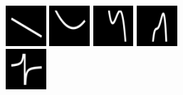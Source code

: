 \documentclass{article}
\begin{document}

\begin{figure}\vspace{-0.5cm} \newcommand{\functionSize}{1.5cm}\centering
  \includegraphics[width = \functionSize]{figures/functions/6.png}
  \includegraphics[width = \functionSize]{figures/functions/48.png}
  \includegraphics[width = \functionSize]{figures/functions/102.png}
  \includegraphics[width = \functionSize]{figures/functions/116.png}\\
  \includegraphics[width = \functionSize]{figures/functions/181.png}

\end{figure}
\end{document}
